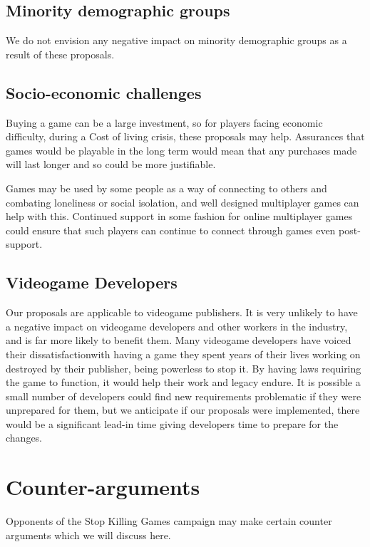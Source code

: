 \subsection{Minority demographic groups}
We do not envision any negative impact on minority demographic groups as a result of these proposals.

\subsection{Socio-economic challenges}
Buying a game can be a large investment\cn, so for players facing economic difficulty, during a Cost of living crisis, these proposals may help.
Assurances that games would be playable in the long term would mean that any purchases made will last longer and so could be more justifiable.

Games may be used by some people as a way of connecting to others and combating loneliness or social isolation,
and well designed multiplayer games can help with this\cite{design-friends-2018}.
Continued support in some fashion for online multiplayer games could ensure that such players can continue to connect through games even post-support.

\subsection{Videogame Developers}
Our proposals are applicable to videogame publishers.
It is very unlikely to have a negative impact on videogame developers and other workers in the industry, and is far more likely to benefit them.
Many videogame developers have voiced their dissatisfaction\cn with having a game they spent years of their lives working on destroyed by their publisher, being powerless to stop it.
By having laws requiring the game to function, it would help their work and legacy endure.
It is possible a small number of developers could find new requirements problematic if they were unprepared for them,
but we anticipate if our proposals were implemented, there would be a significant lead-in time giving developers time to prepare for the changes.



\section{Counter-arguments}
Opponents of the Stop Killing Games campaign may make certain counter arguments which we will discuss here.

